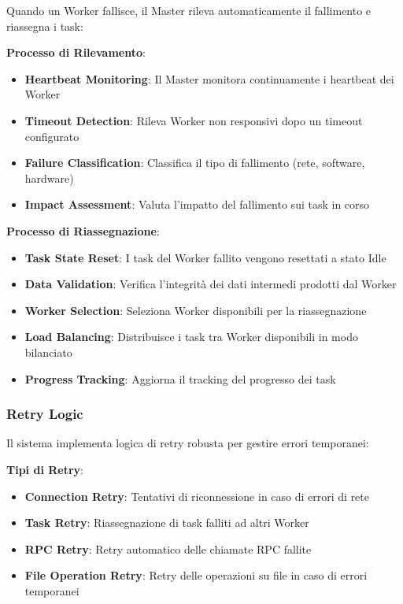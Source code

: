 \documentclass[12pt,a4paper]{article}
\begin{document}
Quando un Worker fallisce, il Master rileva automaticamente il fallimento e riassegna i task:

\textbf{Processo di Rilevamento}:
\begin{itemize}
\item \textbf{Heartbeat Monitoring}: Il Master monitora continuamente i heartbeat dei Worker
\item \textbf{Timeout Detection}: Rileva Worker non responsivi dopo un timeout configurato
\item \textbf{Failure Classification}: Classifica il tipo di fallimento (rete, software, hardware)
\item \textbf{Impact Assessment}: Valuta l'impatto del fallimento sui task in corso
\end{itemize}

\textbf{Processo di Riassegnazione}:
\begin{itemize}
\item \textbf{Task State Reset}: I task del Worker fallito vengono resettati a stato Idle
\item \textbf{Data Validation}: Verifica l'integrità dei dati intermedi prodotti dal Worker
\item \textbf{Worker Selection}: Seleziona Worker disponibili per la riassegnazione
\item \textbf{Load Balancing}: Distribuisce i task tra Worker disponibili in modo bilanciato
\item \textbf{Progress Tracking}: Aggiorna il tracking del progresso dei task
\end{itemize}

\subsubsection{Retry Logic}

Il sistema implementa logica di retry robusta per gestire errori temporanei:

\textbf{Tipi di Retry}:
\begin{itemize}
\item \textbf{Connection Retry}: Tentativi di riconnessione in caso di errori di rete
\item \textbf{Task Retry}: Riassegnazione di task falliti ad altri Worker
\item \textbf{RPC Retry}: Retry automatico delle chiamate RPC fallite
\item \textbf{File Operation Retry}: Retry delle operazioni su file in caso di errori temporanei
\end{itemize}
\end{document}
